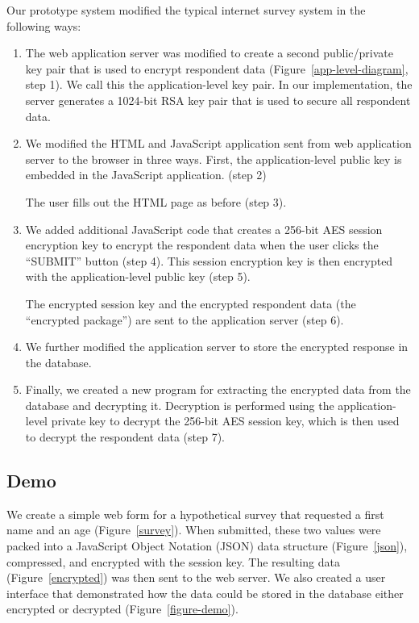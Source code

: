 \documentclass[fleqn,12pt]{wlscirep}
\begin{document}
Our prototype system modified the typical internet survey system in the following ways:

\begin{enumerate}
\item The web application server was modified to create a second
  public/private key pair that is used to encrypt respondent
  data (Figure~\ref{app-level-diagram}, step 1).  We
  call this the application-level key pair. In our implementation, the
  server generates a 1024-bit RSA key pair that is used to secure all
  respondent data.
\item We modified the HTML and JavaScript application sent from web
  application server to the browser in three ways. First, the
  application-level public key is embedded in the JavaScript
  application. (step 2)
  
 The user fills out the HTML page as before (step 3).

\item We added additional JavaScript code that creates a 256-bit
  AES session encryption key to encrypt the respondent data when the user clicks the
  ``SUBMIT'' button (step 4). This session encryption key is then encrypted
  with the application-level public key (step 5).

   The encrypted session key and the encrypted respondent data (the ``encrypted
  package'') are sent to the  application server (step 6). 
\item We further modified the application server to store the encrypted
  response in the database.
\item Finally, we created a new program for extracting the encrypted
  data from the database and decrypting it. Decryption is performed
  using the application-level private key to decrypt the 256-bit AES
  session key, which is then used to decrypt the respondent data (step
  7).
\end{enumerate}


\subsection{Demo}

We create a simple web form for a hypothetical survey that requested a
first name and an age (Figure~\ref{survey}). When submitted, these two
values were packed into a JavaScript Object Notation (JSON) data
structure (Figure~\ref{json}), compressed, and encrypted with the session key. The
resulting data (Figure~\ref{encrypted}) was then sent to the web
server. We also created a user interface that demonstrated how the
data could be stored in the database either encrypted or decrypted (Figure~\ref{figure-demo}).
\end{document}
